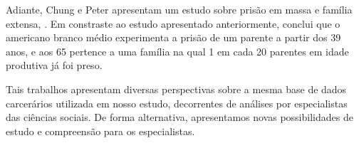 \documentclass[12pt]{article}
\begin{document}
Adiante, Chung e Peter apresentam um estudo sobre prisão em massa e família extensa, \cite{Chung_2018}. Em constraste ao estudo apresentado anteriormente, conclui que o americano branco médio experimenta a prisão de um parente a partir dos 39 anos, e aos 65 pertence a uma família na qual 1 em cada 20 parentes em idade produtiva já foi preso.

Tais trabalhos apresentam diversas perspectivas sobre a mesma base de dados carcerários utilizada em nosso estudo, decorrentes de análises por especialistas das ciências sociais. De forma alternativa, apresentamos novas possibilidades de estudo e compreensão para os especialistas.




\end{document}
